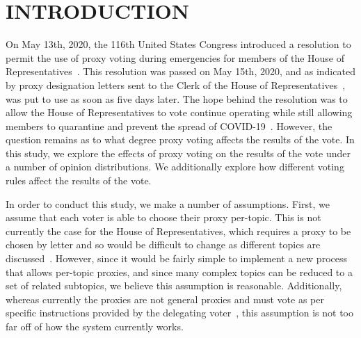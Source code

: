 %
%

\chapter{INTRODUCTION}\label{ch:introduction}
\thispagestyle{empty}

On May 13th, 2020, the 116th United States Congress introduced a resolution
to permit the use of proxy voting during emergencies for members of the House of
Representatives~\cite{Congress.gov2020}.
This resolution was passed on May 15th, 2020, and as indicated by proxy designation
letters sent to the Clerk of the House of Representatives~\cite{Clerk.House.gov2022},
was put to use as soon as five days later.
The hope behind the resolution was to allow the House of Representatives
to vote continue operating while still allowing members to quarantine and
prevent the spread of COVID-19~\cite{Congress.gov2020}.
However, the question remains as to what degree proxy voting affects the results of
the vote.
In this study, we explore the effects of proxy voting on the results of the vote
under a number of opinion distributions.
We additionally explore how different voting rules affect the results of the vote.


In order to conduct this study, we make a number of assumptions.
First, we assume that each voter is able to choose their proxy per-topic.
This is not currently the case for the House of Representatives, which requires
a proxy to be chosen by letter and so would be difficult to change as different
topics are discussed~\cite{Congress.gov2020}.
However, since it would be fairly simple to implement a new process that allows
per-topic proxies, and since many complex topics can be reduced to a set of related
subtopics, we believe this assumption is reasonable.
Additionally, whereas currently the proxies are not general proxies and must vote as
per specific instructions provided by the delegating
voter~\cite{CERP2020, Congress.gov2020}, this assumption is not too far off of how
the system currently works.

